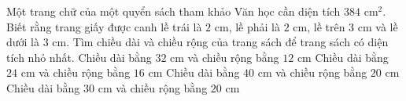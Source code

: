 \begin{ex}%
	Một trang chữ của một quyển sách tham khảo Văn học cần diện tích $384$ cm$^2$. Biết rằng trang giấy được canh lề trái là $2$ cm, lề phải là $2$ cm, lề trên $3$ cm và lề dưới là $3$ cm. Tìm chiều dài và chiều rộng của trang sách để trang sách có diện tích nhỏ nhất.
	\choice
	{Chiều dài bằng $32$ cm và chiều rộng bằng $12$ cm}
	{\True Chiều dài bằng $24$ cm và chiều rộng bằng $16$ cm}
	{Chiều dài bằng $40$ cm và chiều rộng bằng $20$ cm}
	{Chiều dài bằng $30$ cm và chiều rộng bằng $20$ cm}
\end{ex}
